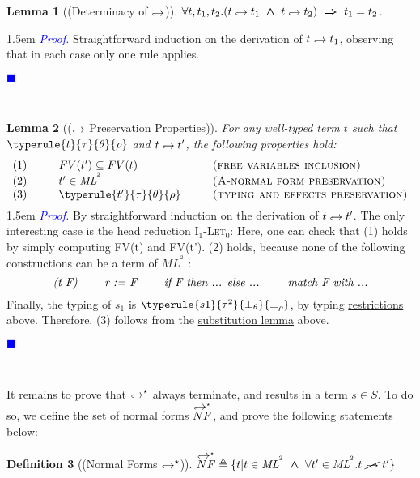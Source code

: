\documentclass[a4paper,11pt,oneside]{article}
\theoremstyle{plain}
\newtheorem{definition}{Definition}[subsection]
\newtheorem{lemma}[definition]{Lemma}
\renewenvironment{proof}{\noindent \begin{adjustwidth}{1.5em}{} \textcolor{blue}{\textit{Proof.}}}
{{\begin{tiny}\textcolor{blue}{$\blacksquare$}\end{tiny}}
\end{adjustwidth}~\\\noindent}
\newcommand{\tmlet}[3]{let~#1=#2~in~#3}
\newcommand{\tmsbst}[3]{#1 [#2 \mapsfrom #3] }
\newcommand{\bwedge}{\boldsymbol{~\wedge~}}
\newcommand{\brarr}{\boldsymbol{~\Rightarrow~}}
\newcommand{\bth}{\bot_\theta}
\newcommand{\brh}{\bot_\rho}
\newcommand{\inlsrc}{\textit{ML}^{^2}}
\newcommand{\inlT}{\inlsrc}
\newcommand{\hookdownarrow}{\mathrel{\rotatebox[origin=c]{180}{$\hookleftarrow$}}}
\newcommand{\inlletarr}{\hookdownarrow}
\newcommand{\inlletstar}{\hookdownarrow^{\star}}
\newcommand{\inlletplus}{\inlletstar}
\newcommand{\inlletNF}{\overset{\inlletplus}{NF}}
\newcommand{\inllet}[2]{#1 \hookdownarrow #2}
\begin{document}
\begin{lemma}[(Determinacy of $\inlletarr$)] 
	$\forall t, t_1, t_2.
		(t \inlletarr {t_1} \bwedge t \inlletarr {t_2}) \brarr
			t_1 = t_2$.	\label{inllet-determ-l}	
\end{lemma}
\begin{proof} Straightforward induction on the derivation of $t \inlletarr {t_1}$, observing that in each case only one rule applies. \end{proof} 
\begin{lemma}[($\inlletarr$ Preservation Properties)]
For any well-typed term $t$ such that\\ $\typerule{t}{\tau}{\theta}{\rho}$ and $\inllet{t}{t'}$, the following properties hold:
\begin{displaymath}
\begin{array}{l@{\hspace*{1cm}}l@{\hspace*{1cm}}l}
	(1)& FV(t') \subseteq FV(t) & \textsc{(free variables inclusion)} \\
	(2)& t' \in \inlT & \textsc{(A-normal form preservation)}\\ 
	(3)& \typerule{t'}{\tau}{\theta}{\rho} &\textsc{(typing and effects preservation)} \vspace*{-0.2cm}
\end{array}
\end{displaymath}
 \label{inllet-prop-l}
\end{lemma}
\begin{proof}
	By straightforward induction on the derivation of $\inllet{t}{t'}$. 
	The only interesting case is the head reduction \textsc{I$_1$-Let$_0$}:
			{\boldsymbol{\tmlet{F}{s_1}{s_2} \hookdownarrow 				
			\tmsbst{s_2}{F}{s_1}}}
	Here, one can check that (1) holds by simply computing  FV(t) and FV(t').
	(2) holds, because none of the following constructions can be a term of $\inlsrc$ : 
$$\textit{(t~F) \qquad r~:=~F \qquad if~F~then~... else ... \qquad match~F~with~...}$$
	Finally, the typing of $s_1$ is $\typerule{s1}{\tau^2}{\bth}{\brh}$, by typing \hyperlink{restr-let-f}{restrictions} above.	
	Therefore, (3) follows from the \hyperlink{subst-lemma}{substitution lemma} above. 
 \end{proof}

It remains to prove that $\inlletstar$ always terminate, and results in a term $s \in S$.  
	To do so, we define the set of normal forms $\inlletNF$, and prove the following statements below: 
\begin{definition}[(Normal Forms $\inlletstar$)]
 $ \inlletNF \triangleq \{ t | t \in \inlT \bwedge 
 \forall t' \in \inlT. t~\cancel{\inlletarr}~t' \} $
\end{definition}
\end{document}
